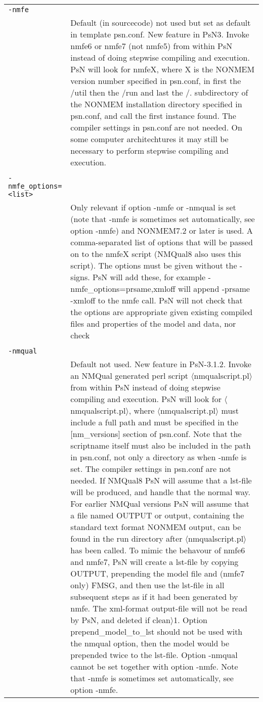 \documentclass[a4paper,12pt]{article}
\begin{document}
\begin{longtable}{p{1in}p{4in}}
\\
\verb|-nmfe| & \\
\nopagebreak
 & Default (in sourcecode) not used but set as default in template psn.conf. New feature in PsN3.  Invoke nmfe6 or nmfe7 (not nmfe5) from within PsN instead of doing stepwise compiling and execution. PsN will look for nmfeX, where X is the NONMEM version number specified in psn.conf, in first the /util then the /run and last the /. subdirectory of the NONMEM installation directory specified in psn.conf, and call the first instance found. The compiler settings in psn.conf are not needed. On some computer architechtures it  may still be necessary to perform stepwise compiling and execution. \\
\\
\verb|-nmfe_options=<list>| & \\
\nopagebreak
 & Only relevant if option -nmfe or -nmqual is set (note that -nmfe is sometimes set automatically, see option -nmfe) and NONMEM7.2 or later is used. A comma-separated list of options that will be passed on to the nmfeX script (NMQual8 also uses this script). The options must be given without the - signs. PsN will add these, for example -nmfe\_options=prsame,xmloff will append \mbox{-prsame} \mbox{-xmloff} to the nmfe call. PsN will not check that the options are appropriate given existing compiled files and properties of the model and data, nor check \\
\\
\verb|-nmqual| & \\
\nopagebreak
 & Default not used. New feature in PsN-3.1.2. Invoke an NMQual generated perl script $\langle$nmqualscript.pl$\rangle$ from within PsN instead of doing stepwise compiling and execution. PsN will look for $\langle$nmqualscript.pl$\rangle$, where $\langle$nmqualscript.pl$\rangle$ must include a full path and must be specified in the [nm\_versions] section of psn.conf. Note that the scriptname itself must also be included in the path in psn.conf, not only a directory as when -nmfe is set. The compiler settings in psn.conf are not needed. If NMQual8 PsN will assume that a lst-file will be produced, and handle that the normal way. For earlier NMQual versions PsN will assume that a file named OUTPUT or output, containing the standard text format  NONMEM output, can be found in the run directory after $\langle$nmqualscript.pl$\rangle$ has been called. To mimic the behavour of nmfe6 and nmfe7, PsN will create a lst-file by copying OUTPUT, prepending the model file and (nmfe7 only) FMSG, and then use the lst-file in all subsequent steps as if it had been generated by nmfe. The xml-format output-file will not be read by PsN, and deleted if clean$\rangle$1. Option prepend\_model\_to\_lst should not be used with the nmqual option, then the model would be prepended twice to the lst-file. Option -nmqual cannot be set together with option -nmfe.  Note that -nmfe is sometimes set automatically, see option -nmfe. \\

\end{longtable}
\end{document}
